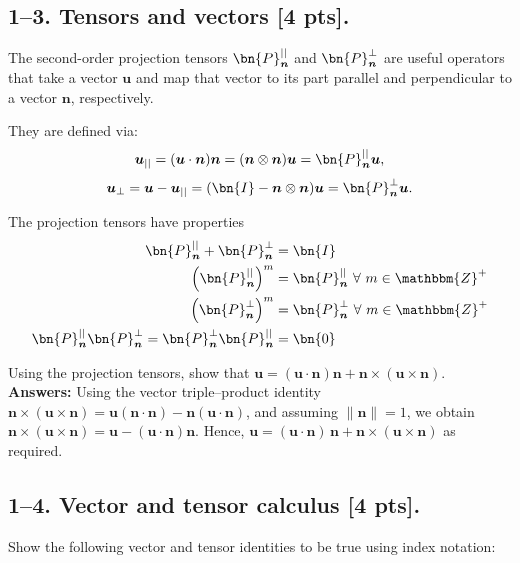 \subsection*{1--3. \textbf{Tensors and vectors} [4 pts].}
The second-order projection tensors $\bn{P}_{\bm{n}}^{||}$ and $\bn{P}_{\bm{n}}^{\perp}$ are useful operators that take a vector $\bm{u}$ and map that vector to its part parallel and perpendicular to a vector $\bm{n}$, respectively. 

They are defined via:
\begin{equation*}
    \bm{u}_{||} = (\bm{u} \cdot \bm{n}) \bm{n} = (\bm{n} \otimes \bm{n}) \bm{u} = \bn{P}_{\bm{n}}^{||} \bm{u},
\end{equation*}
\begin{equation*}
    \bm{u}_{\perp} = \bm{u} - \bm{u}_{||} = (\bn{I} - \bm{n} \otimes \bm{n}) \bm{u} = \bn{P}_{\bm{n}}^{\perp} \bm{u}.
\end{equation*}

The projection tensors have properties
\begin{align*}
    \bn{P}_{\bm{n}}^{||} + \bn{P}_{\bm{n}}^{\perp} &= \bn{I} \\
    \left(\bn{P}_{\bm{n}}^{||} \right)^m &= \bn{P}_{\bm{n}}^{||} ~\forall ~m \in \mathbbm{Z}^+\\
    \left(\bn{P}_{\bm{n}}^{\perp} \right)^m &= \bn{P}_{\bm{n}}^{\perp} ~\forall ~m \in \mathbbm{Z}^+\\
    \bn{P}_{\bm{n}}^{||} \bn{P}_{\bm{n}}^{\perp} = \bn{P}_{\bm{n}}^{\perp} \bn{P}_{\bm{n}}^{||}  &= \bn{0}
\end{align*}

Using the projection tensors, show that $\bm{u} = (\bm{u} \cdot \bm{n}) \bm{n} + \bm{n} \times (\bm{u} \times \bm{n} )$.
\bigskip
\textbf{Answers:}
Using the vector triple–product identity
$\bm{n}\times(\bm{u}\times\bm{n})=\bm{u}(\bm{n}\cdot\bm{n})-\bm{n}(\bm{u}\cdot\bm{n})$,
and assuming $\|\bm{n}\|=1$, we obtain
$\bm{n}\times(\bm{u}\times\bm{n})=\bm{u}-(\bm{u}\cdot\bm{n})\bm{n}$.
Hence,
$\bm{u}=(\bm{u}\cdot\bm{n})\,\bm{n}+\bm{n}\times(\bm{u}\times\bm{n})$
as required.

\bigskip
\subsection*{1--4. \textbf{Vector and tensor calculus} [4 pts].} Show the following vector and tensor identities to be true using index notation:

